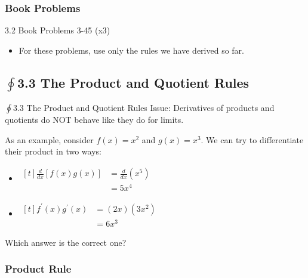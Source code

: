 \documentclass[cal1spr16Lectures.tex]{subfiles}
\begin{document}
\subsubsection{Book Problems}

\begin{frame}{}
\begin{block}{3.2 Book Problems} 3-45 (x3) \end{block} 
\begin{itemize}
\item For these problems, use only the rules we have derived so far.
\end{itemize}
\end{frame}

\subsection[3.3 The Product and Quotient Rules]{$\textstyle\oint$3.3 The Product and Quotient Rules}

\begin{frame}{$\oint$3.3 The Product and Quotient Rules}
Issue: Derivatives of products and quotients do \alert{NOT} behave like they do for limits.  
\end{frame}

\begin{frame}\footnotesize
As an example, consider $f(x)=x^2$ and $g(x)=x^3$.  We can try to differentiate their product in two ways:
\begin{itemize}\footnotesize
\item $\begin{aligned}[t]
	\frac{d}{dx}[f(x)g(x)] &= \frac{d}{dx}\left(x^5 \right) \\[0.25pc]
	 &= 5x^4
	\end{aligned}$
\item $\begin{aligned}[t]
	f^{\prime}(x)g^{\prime}(x) &= (2x)(3x^2) \\
	 &= 6x^3
	 \end{aligned}$
\end{itemize}
\begin{que}Which answer is the correct one? \end{que}
\end{frame}

\subsubsection{Product Rule}
\end{document}
